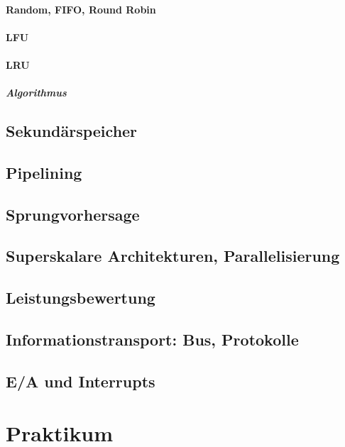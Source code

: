 \subsection{Random, FIFO, Round Robin}
\subsection{LFU}
\subsection{LRU}
\subsubsection{Algorithmus}

\chapter{Sekundärspeicher}

\chapter{Pipelining}

\chapter{Sprungvorhersage}

\chapter{Superskalare Architekturen, Parallelisierung}

\chapter{Leistungsbewertung}

\chapter{Informationstransport: Bus, Protokolle}

\chapter{E/A und Interrupts}

\part{Praktikum}


